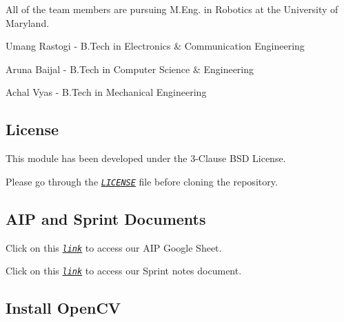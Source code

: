 All of the team members are pursuing M.\+Eng. in Robotics at the University of Maryland.


\begin{DoxyItemize}
\item Umang Rastogi -\/ B.\+Tech in Electronics \& Communication Engineering
\item Aruna Baijal -\/ B.\+Tech in Computer Science \& Engineering
\item Achal Vyas -\/ B.\+Tech in Mechanical Engineering
\end{DoxyItemize}

\subsection*{License}


\begin{DoxyItemize}
\item This module has been developed under the 3-\/\+Clause B\+SD License.
\item Please go through the \href{https://github.com/urastogi885/humanDetectionModule/blob/phase1/LICENSE}{\tt {\itshape L\+I\+C\+E\+N\+SE}} file before cloning the repository.
\end{DoxyItemize}

\subsection*{A\+IP and Sprint Documents}


\begin{DoxyItemize}
\item Click on this \href{https://docs.google.com/spreadsheets/d/1oHHijKNsoFVp84mNC5g5sJ4BwJQwT6XpO5uRFw9AMzE/edit?usp=sharing}{\tt {\itshape link}} to access our A\+IP Google Sheet.
\item Click on this \href{https://docs.google.com/document/d/13PsjxV7XgBc0alKm0SCArrKI3s-3ExToed2AtDfnuaQ/edit?usp=sharing}{\tt {\itshape link}} to access our Sprint notes document.
\end{DoxyItemize}

\subsection*{Install Open\+CV}


